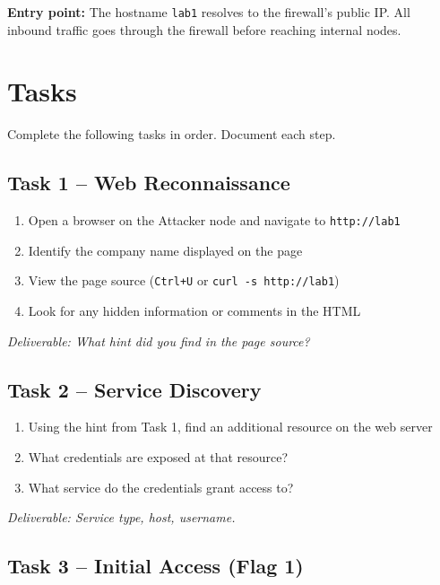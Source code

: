 \documentclass[a4paper, 12pt]{article}
\begin{document}
\textbf{Entry point:} The hostname \texttt{lab1} resolves to the firewall's
public IP. All inbound traffic goes through the firewall before reaching
internal nodes.

\section{Tasks}

Complete the following tasks in order. Document each step.

\subsection{Task 1 -- Web Reconnaissance}

\begin{enumerate}[leftmargin=2em]
  \item Open a browser on the Attacker node and navigate to \texttt{http://lab1}
  \item Identify the company name displayed on the page
  \item View the page source (\texttt{Ctrl+U} or \texttt{curl -s http://lab1})
  \item Look for any hidden information or comments in the HTML
\end{enumerate}

\textit{Deliverable: What hint did you find in the page source?}

\subsection{Task 2 -- Service Discovery}

\begin{enumerate}[leftmargin=2em]
  \item Using the hint from Task 1, find an additional resource on the web server
  \item What credentials are exposed at that resource?
  \item What service do the credentials grant access to?
\end{enumerate}

\textit{Deliverable: Service type, host, username.}

\subsection{Task 3 -- Initial Access (Flag 1)}
\end{document}
